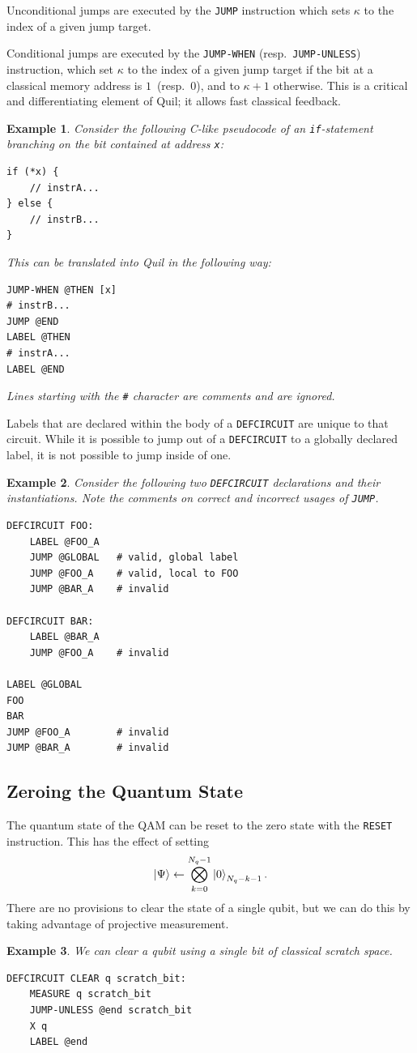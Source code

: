 \documentclass[conference]{IEEEtran}
\newtheorem{example}{Example}
\begin{document}
Unconditional jumps are executed by the \verb|JUMP| instruction which sets $\kappa$ to the index of a given jump target.

Conditional jumps are executed by the \verb|JUMP-WHEN| (resp.\ \verb|JUMP-UNLESS|) instruction, which set $\kappa$ to the index of a given jump target if the bit at a classical memory address is $1$~(resp.\ $0$), and to $\kappa+1$ otherwise. This is a critical and differentiating element of Quil; it allows fast classical feedback.

\begin{example}
Consider the following C-like pseudocode of an \verb|if|-statement branching on the bit contained at address \verb|x|:
\begin{verbatim}
if (*x) {
    // instrA...
} else {
    // instrB...
}
\end{verbatim}
This can be translated into Quil in the following way:
\begin{verbatim}
JUMP-WHEN @THEN [x]
# instrB...
JUMP @END
LABEL @THEN
# instrA...
LABEL @END
\end{verbatim}
Lines starting with the \verb|#| character are comments and are ignored.
\end{example}

Labels that are declared within the body of a \verb|DEFCIRCUIT| are unique to that circuit. While it is possible to jump out of a \verb|DEFCIRCUIT| to a globally declared label, it is not possible to jump inside of one.
\begin{example}
Consider the following two \verb|DEFCIRCUIT| declarations and their instantiations. Note the comments on correct and incorrect usages of \verb|JUMP|.
\begin{verbatim}
DEFCIRCUIT FOO:
    LABEL @FOO_A
    JUMP @GLOBAL   # valid, global label
    JUMP @FOO_A    # valid, local to FOO
    JUMP @BAR_A    # invalid

DEFCIRCUIT BAR:
    LABEL @BAR_A
    JUMP @FOO_A    # invalid

LABEL @GLOBAL
FOO
BAR
JUMP @FOO_A        # invalid
JUMP @BAR_A        # invalid

\end{verbatim}
\end{example}

\subsection{Zeroing the Quantum State}
The quantum state of the QAM can be reset to the zero state with the \verb|RESET| instruction. This has the effect of setting \[\ket{\Psi}\leftarrow\bigotimes_{k=0}^{N_q-1}\ket{0}_{N_q-k-1}.\]
There are no provisions to clear the state of a single qubit, but we can do this by taking advantage of projective measurement.
\begin{example}
We can clear a qubit using a single bit of classical scratch space.
\begin{verbatim}
DEFCIRCUIT CLEAR q scratch_bit:
    MEASURE q scratch_bit
    JUMP-UNLESS @end scratch_bit
    X q
    LABEL @end
\end{verbatim}
\end{example}
\end{document}
